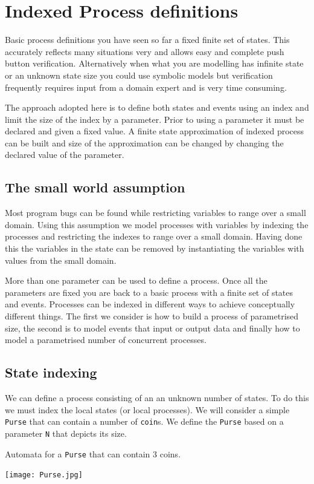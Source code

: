 \documentclass[]{article}
\begin{document}
\section{Indexed Process definitions}
Basic process definitions you have seen so far a fixed finite set of states. This accurately reflects  many situations very 
 and allows easy and complete push button verification. Alternatively when what you are modelling has infinite state or an unknown state size you could use symbolic models but verification  frequently requires  input from a domain expert and is very time consuming.

The approach adopted here is to define both states and events using an index and limit the size of the index by a parameter.  Prior to using a parameter it must be declared and given a fixed value. A finite state approximation of indexed process can be built and size of the approximation can be changed by changing the declared value of the parameter.

\subsection{The small world assumption}

Most program bugs can be found while restricting variables to range over a small domain. Using this assumption we  model processes with variables by indexing the processes and restricting the indexes to range over a small domain. Having done this the variables in the state can be removed by instantiating the variables with values from the small domain.

More than one parameter can be used to define a process.  Once all the parameters are fixed you are back to a basic process with a finite set of states and events.
Processes can be indexed in different ways to achieve  conceptually different things. The first we consider is how to build a process of parametrised    size,  the second is to model events that input or output data and finally how to model a parametrised number of concurrent processes.

\subsection{State indexing}

We can define a process consisting of an  an unknown number of states. To do this we must index the local states (or local processes).
We will consider a simple \verb|Purse| that can contain a number of \verb|coin|s. We define the \verb|Purse| based on a parameter \verb|N| that depicts its size.
\noindent\begin{center}
Automata for a \verb|Purse| that can contain 3 coins.

\texttt{[image: Purse.jpg]} \end{center}
\end{document}
